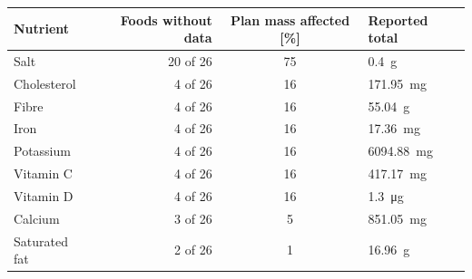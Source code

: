 \begin{tabular}{l r S[table-format=2.0] l}
\toprule
Nutrient & Foods without data & {Plan mass affected [\si{\percent}]} & Reported total \\
\midrule
Salt          & 20 of 26 & 75 & \qty{0.4}{\gram} \\
Cholesterol   & 4 of 26  & 16 & \qty{171.95}{\milli\gram} \\
Fibre         & 4 of 26  & 16 & \qty{55.04}{\gram} \\
Iron          & 4 of 26  & 16 & \qty{17.36}{\milli\gram} \\
Potassium     & 4 of 26  & 16 & \qty{6094.88}{\milli\gram} \\
Vitamin C     & 4 of 26  & 16 & \qty{417.17}{\milli\gram} \\
Vitamin D     & 4 of 26  & 16 & \qty{1.3}{\micro\gram} \\
Calcium       & 3 of 26  & 5  & \qty{851.05}{\milli\gram} \\
Saturated fat & 2 of 26  & 1  & \qty{16.96}{\gram} \\
\bottomrule
\end{tabular}
